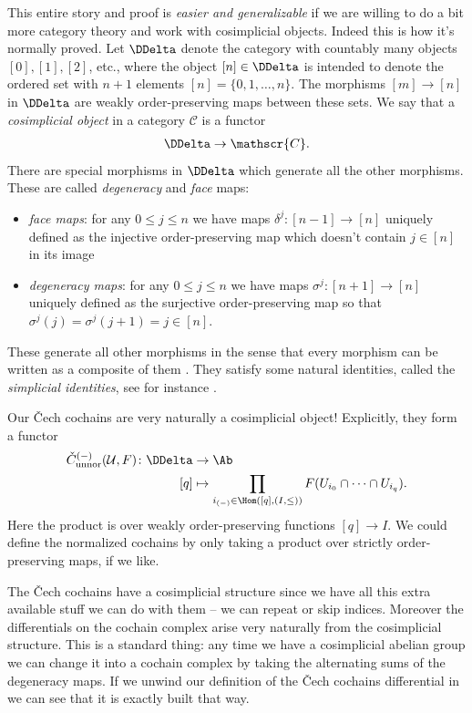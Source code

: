 \documentclass[11pt]{book}
\begin{document}
\begin{remark} This entire story and proof is \emph{easier and generalizable} if we are willing to do a bit more category theory and work with cosimplicial objects. Indeed this is how it's normally proved. Let $\DDelta$ denote the category with countably many objects $[0],[1],[2]$, etc., where the object $[n] \in \DDelta$ is intended to denote the ordered set with $n+1$ elements $[n] = \{0,1, \ldots, n\}$. The morphisms $[m]\to[n]$ in $\DDelta$ are weakly order-preserving maps between these sets. We say that a \emph{cosimplicial object} in a category $\mathscr{C}$ is a functor
\begin{align*}
    \DDelta \to \mathscr{C}.
\end{align*}
There are special morphisms in $\DDelta$ which generate all the other morphisms. These are called \emph{degeneracy} and \emph{face} maps:
\begin{itemize}
    \item \emph{face maps}: for any $0\le j\le n$ we have maps $\delta^j \colon [n-1]\to [n]$ uniquely defined as the injective order-preserving map which doesn't contain $j\in[n]$ in its image
    \item \emph{degeneracy maps}: for any $0\le j\le n$ we have maps $\sigma^j \colon [n+1]\to[n]$ uniquely defined as the surjective order-preserving map so that $\sigma^j(j)=\sigma^j(j+1)=j\in [n]$.
\end{itemize}
These generate all other morphisms in the sense that every morphism can be written as a composite of them \cite[0166]{Stacks}. They satisfy some natural identities, called the \emph{simplicial identities}, see for instance \cite[0167]{Stacks}.

Our \v{C}ech cochains are very naturally a cosimplicial object! Explicitly, they form a functor
\begin{align*}
    \check{C}^{(-)}_\text{unnor}(\mathcal{U},F) \colon \DDelta &\to \Ab \\
    [q] &\mapsto \prod_{i_{(-)} \in \Hom([q],(I,\le))} F(U_{i_0}\cap \cdots \cap U_{i_q}).
\end{align*}
Here the product is over weakly order-preserving functions $[q]\to I$. We could define the normalized cochains by only taking a product over strictly order-preserving maps, if we like. 

The \v{C}ech cochains have a cosimplicial structure since we have all this extra available stuff we can do with them -- we can repeat or skip indices. Moreover the differentials on the cochain complex arise very naturally from the cosimplicial structure. This is a standard thing: any time we have a cosimplicial abelian group we can change it into a cochain complex by taking the alternating sums of the degeneracy maps. If we unwind our definition of the \v{C}ech cochains differential in  we can see that it is exactly built that way. 


\end{remark}
\end{document}
